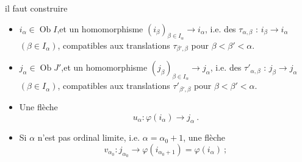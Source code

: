 \documentclass[11pt]{article}
\newcommand{\printedpage}[1]{\marginpar{\footnotesize p.~#1}}
\newcommand{\msp}[1]{\marginpar{\footnotesize [#1]}}
\newcommand{\Ob}{\operatorname{Ob}}
\begin{document}
\msp{page 317}

il faut construire

\printedpage{120}
\begin{itemize}[leftmargin=*]
\item[1)] $i_\alpha\in\Ob I$,\quad et un homomorphisme $(i_\beta)_{\beta\in I_\alpha}\longrightarrow i_\alpha$, i.e. des $\tau_{\alpha,\beta}$ : $i_\beta\longrightarrow i_\alpha$ $(\beta\in I_\alpha)$, compatibles aux translations $\tau_{\beta',\beta}$ pour $\beta<\beta'<\alpha$.
\item[2)] $j_\alpha\in\Ob J'$,\quad et un homomorphisme $(j_\beta)_{\beta\in I_\alpha}\longrightarrow j_\alpha$, i.e. des $\tau'_{\alpha,\beta}$ : $j_\beta\longrightarrow j_\alpha$ $(\beta\in I_\alpha)$, compatibles aux translations $\tau'_{\beta',\beta}$ pour $\beta<\beta'<\alpha$.
\item[3)] Une flèche
\[
u_\alpha:\varphi(i_\alpha)\longrightarrow j_\alpha\ .
\]
\item[4)] Si $\alpha$ n'est pas ordinal limite, i.e. $\alpha=\alpha_0+1$, une flèche
\[
v_{\alpha_0}:j_{\alpha_0}\longrightarrow\varphi(i_{\alpha_0+1})=\varphi(i_\alpha)\ ;
\]
\end{itemize}
\end{document}
